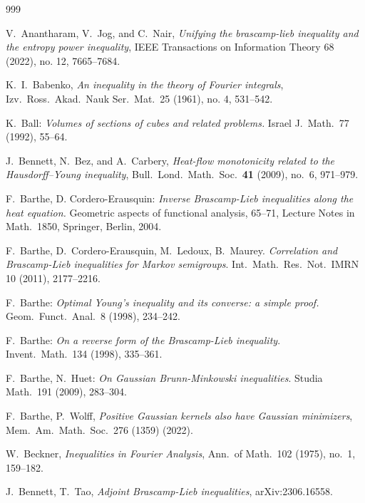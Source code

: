 \documentclass[9pt, a4paper]{amsart}
\newcommand{\1}{{\chi_{}}}%
\numberwithin{equation}{section}
\begin{document}
	
	

	

     
	
\begin{thebibliography}{999}

{\sc V.~Anantharam, V.~Jog, and C.~Nair}, 
{\em Unifying the brascamp-lieb inequality and the entropy power inequality}, 
IEEE Transactions on Information Theory 68 (2022), no. 12, 7665--7684.

{\sc K.~I.~Babenko}, 
{\em An inequality in the theory of Fourier integrals}, 
Izv.\ Ross.\ Akad.\ Nauk Ser.\ Mat.\ 25 (1961), no. 4, 531--542.

{\sc K.~Ball}: 
{\em Volumes of sections of cubes and related problems.} 
Israel J.\ Math.\ 77 (1992), 55--64.

{\sc J.~Bennett, N.~Bez, and A.~Carbery}, 
{\em Heat-flow monotonicity related to the Hausdorff--Young inequality}, 
Bull.\ Lond.\ Math.\ Soc.\ {\bf 41} (2009), no.~6, 971--979.

{\sc F.~Barthe, D. Cordero-Erausquin}: 
{\em Inverse Brascamp-Lieb inequalities along the heat equation.} 
Geometric aspects of functional analysis, 65--71, Lecture Notes in Math.\ 1850, Springer, Berlin, 2004.

{\sc F.~Barthe, D.~Cordero-Erausquin, M.~Ledoux, B.~Maurey}.
{\em Correlation and Brascamp-Lieb inequalities for Markov semigroups}. 
Int.\ Math.\ Res.\ Not.\ IMRN 10 (2011), 2177--2216.

{\sc F.~Barthe}: 
{\em Optimal Young’s inequality and its converse: a simple proof.} 
Geom.\ Funct.\ Anal.\ 8 (1998), 234--242.

{\sc F.~Barthe}: 
{\em On a reverse form of the Brascamp-Lieb inequality}. 
Invent.\ Math.\ 134 (1998), 335--361.

{\sc F.~Barthe, N.~Huet}: 
{\em On Gaussian Brunn-Minkowski inequalities}. 
Studia Math.\ 191 (2009), 283--304.

{\sc F.~Barthe, P.~Wolff}, 
{\em Positive Gaussian kernels also have Gaussian minimizers}, 
Mem.\ Am.\ Math.\ Soc.\ 276 (1359) (2022).

{\sc W.~Beckner}, 
{\em Inequalities in Fourier Analysis}, 
Ann.\ of Math.\ 102 (1975), no.~1, 159--182.



{\sc J.~Bennett, T.~Tao}, 
{\em Adjoint Brascamp-Lieb inequalities}, 
arXiv:2306.16558.


\end{thebibliography}
\end{document}
